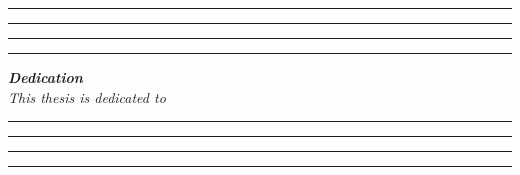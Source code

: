 \thispagestyle{empty}


\thispagestyle{empty}
\hrule\hrule\hrule\hrule %
\vspace{1 in}
\begin{center}

\textbf{\huge\textit{ Dedication}}\\
\vspace{.5 in}
\Large\textit{This thesis is dedicated to}
\end{center}






\vfill
\hrule\hrule\hrule\hrule
\clearpage
              
